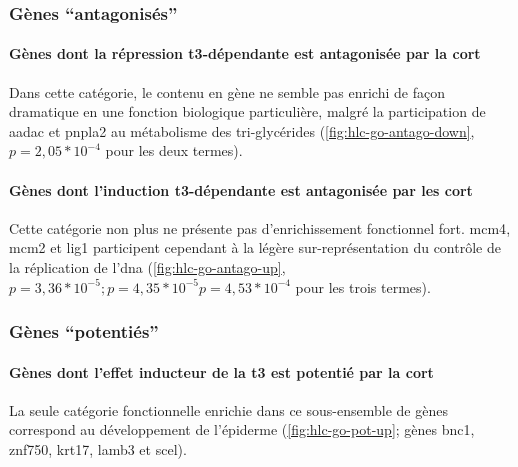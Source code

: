 \documentclass[../main.tex]{subfiles}
\begin{document}

		\subsubsection{Gènes ``antagonisés''}

			\paragraph{Gènes dont la répression \gls{t3}-dépendante est antagonisée par la \gls{cort}}
				Dans cette catégorie, le contenu en gène ne semble pas enrichi de façon dramatique en une fonction biologique particulière, malgré la participation de \gls{aadac} et \gls{pnpla2} au métabolisme des tri-glycérides (\autoref{fig:hlc-go-antago-down}, $\textit{p} = 2,05 * 10^{-4}$ pour les deux termes).

				

			\paragraph{Gènes dont l'induction \gls{t3}-dépendante est antagonisée par les \gls{cort}}
				Cette catégorie non plus ne présente pas d'enrichissement fonctionnel fort.
				\gls{mcm4}, \gls{mcm2} et \gls{lig1} participent cependant à la légère sur-représentation du contrôle de la réplication de l'\gls{dna} (\autoref{fig:hlc-go-antago-up}, $\textit{p}=3,36*10^{-5}; \textit{p}=4,35*10^{-5}\textit{p}=4,53*10^{-4}$ pour les trois termes).

				


		\subsubsection{Gènes ``potentiés''}

			\paragraph{Gènes dont l'effet inducteur de la \gls{t3} est potentié par la \gls{cort}}
				La seule catégorie fonctionnelle enrichie dans ce sous-ensemble de gènes correspond au développement de l'épiderme (\autoref{fig:hlc-go-pot-up}; gènes \gls{bnc1}, \gls{znf750}, \gls{krt17}, \gls{lamb3} et \gls{scel}).
\end{document}
